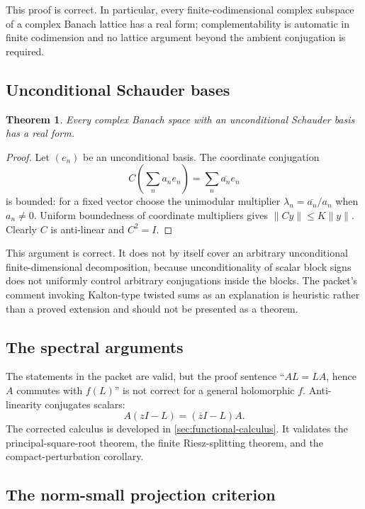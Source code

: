 \documentclass[11pt]{article}
\newtheorem{theorem}{Theorem}[section]
\theoremstyle{definition}
\theoremstyle{remark}
\begin{document}
This proof is correct. In particular, every finite-codimensional complex subspace of a complex Banach lattice has a real form; complementability is automatic in finite codimension and no lattice argument beyond the ambient conjugation is required.

\subsection{Unconditional Schauder bases}

\begin{theorem}\label{thm:unconditional}
Every complex Banach space with an unconditional Schauder basis has a real form.
\end{theorem}

\begin{proof}
Let $(e_n)$ be an unconditional basis. The coordinate conjugation
\[
 C\left(\sum_n a_ne_n\right)=\sum_n\overline{a_n}e_n
\]
is bounded: for a fixed vector choose the unimodular multiplier $\lambda_n=\overline{a_n}/a_n$ when $a_n\ne0$. Uniform boundedness of coordinate multipliers gives $\|Cy\|\leq K\|y\|$. Clearly $C$ is anti-linear and $C^2=I$.
\end{proof}

This argument is correct. It does not by itself cover an arbitrary unconditional finite-dimensional decomposition, because unconditionality of scalar block signs does not uniformly control arbitrary conjugations inside the blocks. The packet's comment invoking Kalton-type twisted sums as an explanation is heuristic rather than a proved extension and should not be presented as a theorem.

\subsection{The spectral arguments}

The statements in the packet are valid, but the proof sentence ``$AL=LA$, hence $A$ commutes with $f(L)$'' is not correct for a general holomorphic $f$. Anti-linearity conjugates scalars:
\[
       A(zI-L)=(\bar zI-L)A.
\]
The corrected calculus is developed in \cref{sec:functional-calculus}. It validates the principal-square-root theorem, the finite Riesz-splitting theorem, and the compact-perturbation corollary.

\subsection{The norm-small projection criterion}
\end{document}
